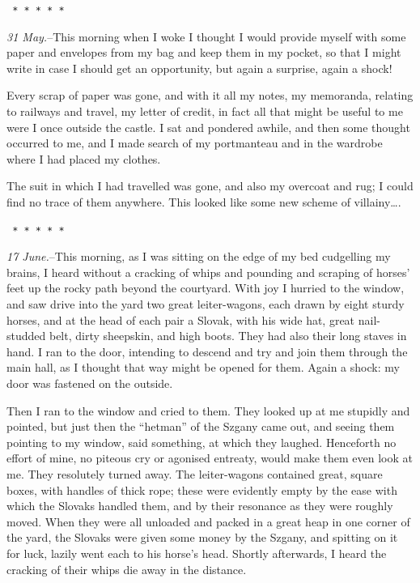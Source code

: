 \documentclass[12pt,openright]{book}
\begin{document}
\texttt{   *       *       *       *       *}

\textit{31 May.}–This morning when I woke I thought I would provide myself with some paper and envelopes from my bag and keep them in my pocket, so that I might write in case I should get an opportunity, but again a surprise, again a shock!

Every scrap of paper was gone, and with it all my notes, my memoranda, relating to railways and travel, my letter of credit, in fact all that might be useful to me were I once outside the castle. I sat and pondered awhile, and then some thought occurred to me, and I made search of my portmanteau and in the wardrobe where I had placed my clothes.

The suit in which I had travelled was gone, and also my overcoat and rug; I could find no trace of them anywhere. This looked like some new scheme of villainy….

\texttt{   *       *       *       *       *}

\textit{17 June.}–This morning, as I was sitting on the edge of my bed cudgelling my brains, I heard without a cracking of whips and pounding and scraping of horses’ feet up the rocky path beyond the courtyard. With joy I hurried to the window, and saw drive into the yard two great leiter-wagons, each drawn by eight sturdy horses, and at the head of each pair a Slovak, with his wide hat, great nail-studded belt, dirty sheepskin, and high boots. They had also their long staves in hand. I ran to the door, intending to descend and try and join them through the main hall, as I thought that way might be opened for them. Again a shock: my door was fastened on the outside.

Then I ran to the window and cried to them. They looked up at me stupidly and pointed, but just then the “hetman” of the Szgany came out, and seeing them pointing to my window, said something, at which they laughed. Henceforth no effort of mine, no piteous cry or agonised entreaty, would make them even look at me. They resolutely turned away. The leiter-wagons contained great, square boxes, with handles of thick rope; these were evidently empty by the ease with which the Slovaks handled them, and by their resonance as they were roughly moved. When they were all unloaded and packed in a great heap in one corner of the yard, the Slovaks were given some money by the Szgany, and spitting on it for luck, lazily went each to his horse’s head. Shortly afterwards, I heard the cracking of their whips die away in the distance.
\end{document}
